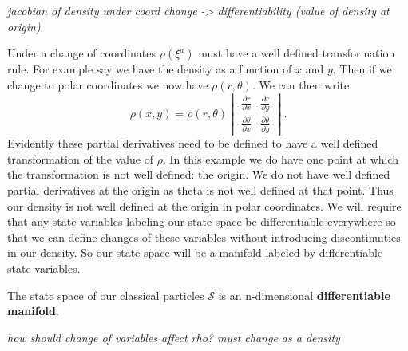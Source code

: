 \documentclass{article}
\begin{document}
	\emph{jacobian of density under coord change -> differentiability (value of density at origin)}

	Under a change of coordinates $\rho(\xi^a)$ must have a well defined transformation rule. For example say we have the density as a function of $x$ and $y$. Then if we change to polar coordinates we now have $\rho(r,\theta)$. We can then write $$\rho(x,y) = \rho(r,\theta)\begin{vmatrix}
\frac{\partial r}{\partial x} & \frac{\partial r}{\partial y} \\
\frac{\partial \theta}{\partial x} & \frac{\partial \theta}{\partial y}
\end{vmatrix}.$$ Evidently these partial derivatives need to be defined to have a well defined transformation of the value of $\rho$. In this example we do have one point at which the transformation is not well defined: the origin. We do not have well defined partial derivatives at the origin as theta is not well defined at that point. Thus our density is not well defined at the origin in polar coordinates. We will require that any state variables labeling our state space be differentiable everywhere so that we can define changes of these variables without introducing discontinuities in our density. So our state space will be a manifold labeled by differentiable state variables.

\begin{prop}
	The state space of our classical particles $\mathcal{S}$ is an n-dimensional \textbf{differentiable manifold}.
\end{prop}

\emph{how should change of variables affect rho? must change as a density}
\end{document}
